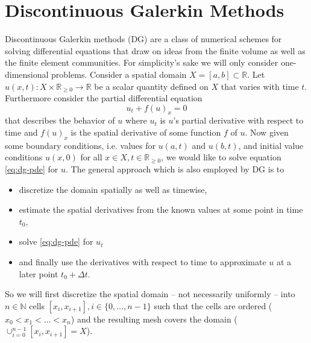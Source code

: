 \section{Discontinuous Galerkin Methods}
\label{sec:dg}

Discontinuous Galerkin methods (DG) are a class of numerical schemes for solving differential equations that draw on ideas from the finite volume as well as the finite element communities.
For simplicity's sake we will only consider one-dimensional problems.
Consider a spatial domain $X = [a, b] \subset \mathbb{R}$.
Let $u(x, t) : X \times \mathbb{R}_{\ge 0} \rightarrow \mathbb{R}$ be a scalar quantity defined on $X$ that varies with time $t$.
Furthermore consider the partial differential equation
\begin{equation}
  \label{eq:dg-pde}
  u_{t} + f(u)_{x} = 0
\end{equation}
that describes the behavior of $u$ where $u_{t}$ is $u$'s partial derivative with respect to time and $f(u)_{x}$ is the spatial derivative of some function $f$ of $u$.
Now given some boundary conditions, i.e. values for $u(a, t)$ and $u(b, t)$, and initial value conditions $u(x, 0)$ for all $x \in X, t \in \mathbb{R}_{\ge 0}$, we would like to solve equation \eqref{eq:dg-pde} for $u$.
The general approach which is also employed by DG is to
\begin{itemize}
\item discretize the domain spatially as well as timewise,
\item estimate the spatial derivatives from the known values at some point in time $t_{0}$,
\item solve \eqref{eq:dg-pde} for $u_{t}$
\item and finally use the derivatives with respect to time to approximate $u$ at a later point $t_{0} + \Delta t$.
\end{itemize}
So we will first discretize the spatial domain -- not necessarily uniformly -- into $n \in \mathbb{N}$ cells $[x_{i}, x_{i + 1}], i \in \{ 0, \dots, n - 1 \}$ such that the cells are ordered ($x_{0} < x_{1} < \dots < x_{n}$) and the resulting mesh covers the domain ($\cup_{i = 0}^{n - 1} [x_{i}, x_{i + 1}] = X$).

